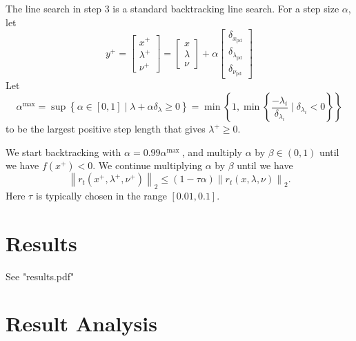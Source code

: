 \documentclass{article}
\begin{document}
The line search in step 3 is a standard backtracking line search.
For a step size $\alpha$, let
$$
y^{+}=\left[\begin{array}{c}
x^{+} \\
\lambda^{+} \\
\nu^{+}
\end{array}\right]=\left[\begin{array}{c}
x \\
\lambda \\
\nu
\end{array}\right]+\alpha\left[\begin{array}{l}
\delta_{x_{\mathrm{pd}}} \\
\delta_{\lambda_{\mathrm{pd}}} \\
\delta_{\nu_{\mathrm{pd}}}
\end{array}\right]
$$
Let
$$
\alpha^{\max }=\sup \left\{\alpha \in[0,1] \mid \lambda+\alpha \delta_\lambda \geq 0\right\}=\min \left\{1, \min \left\{\frac{-\lambda_i}{\delta_{\lambda_i}} \mid \delta_{\lambda_i}<0\right\}\right\}
$$
to be the largest positive step length that gives $\lambda^{+} \geq 0$.

We start backtracking with $\alpha=0.99 \alpha^{\text {max }}$, and multiply $\alpha$ by $\beta \in(0,1)$ until we have $f\left(x^{+}\right)<0$. We continue multiplying $\alpha$ by $\beta$ until we have
$$
\left\|r_t\left(x^{+}, \lambda^{+}, \nu^{+}\right)\right\|_2 \leq(1-\tau \alpha)\left\|r_t(x, \lambda, \nu)\right\|_2 .
$$
Here $\tau$ is typically chosen in the range $[0.01,0.1]$.


\section{Results}

See "results.pdf"

\section{Result Analysis}
\end{document}
